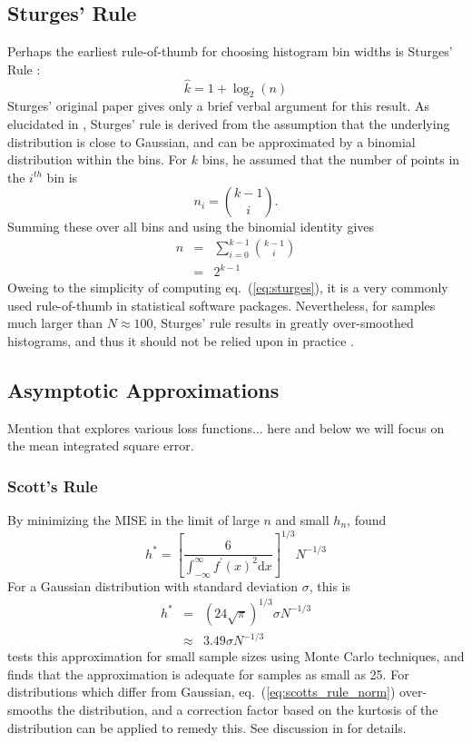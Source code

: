 \documentclass[12pt]{article}
\newcommand{\dd}{\mathrm{d}}
\newcommand{\eqn}[1]{eq.~(\ref{eq:#1})}
\begin{document}
\subsection{Sturges' Rule}
Perhaps the earliest rule-of-thumb for choosing histogram bin widths is
Sturges' Rule \citep{Sturges1926}:
\begin{equation}
  \label{eqn:sturges}
  \hat{k} = 1 + \log_2(n)
\end{equation}
Sturges' original paper gives only a brief verbal argument for this result.
As elucidated in \citet{Scott2009}, Sturges' rule is derived from the
assumption that the underlying distribution is close to Gaussian, and
can be approximated by a binomial distribution within the bins.  For $k$ bins,
he assumed that the number of points in the $i^{th}$ bin is 
\begin{equation}
  n_i = \binom{k - 1}{i}.
\end{equation}
Summing these over all bins and using the binomial identity gives
\begin{eqnarray}
  n &=& \sum_{i=0}^{k-1} \binom{k-1}{i}\\
    &=& 2^{k - 1}
\end{eqnarray}
Oweing to the simplicity of computing \eqn{sturges}, it is a very commonly
used rule-of-thumb in statistical software packages.  Nevertheless, for
samples much larger than $N \approx 100$, Sturges' rule results in greatly
over-smoothed histograms, and thus it should not be relied upon in practice
\citep{Scott2009}.

\subsection{Asymptotic Approximations}
Mention that \citet{Birge2003} explores various loss functions... here
and below we will focus on the mean integrated square error.

\subsubsection{Scott's Rule}
By minimizing the MISE in the limit of large $n$ and small $h_n$, 
\citep{Scott1979} found
\begin{equation}
  \label{eq:scotts_rule}
  h^\ast = \left[\frac{6}{\int_{-\infty}^\infty f^\prime(x)^2 \dd x}\right]^{1/3}
  N^{-1/3}
\end{equation}
For a Gaussian distribution with standard deviation $\sigma$, this is 
\begin{eqnarray}
  \label{eq:scotts_rule_norm}
  h^\ast &=& (24\sqrt{\pi})^{1/3}\sigma N^{-1/3}\\
        &\approx& 3.49 \sigma N^{-1/3}
\end{eqnarray}
\citet{Scott1979} tests this approximation for small sample sizes using Monte
Carlo techniques, and finds that the approximation is adequate for samples
as small as 25.  For distributions which differ from Gaussian,
\eqn{scotts_rule_norm} over-smooths the distribution, and a correction factor
based on the kurtosis of the distribution can be applied to remedy this.  See
discussion in \citet{Scott1979} for details.
\end{document}
